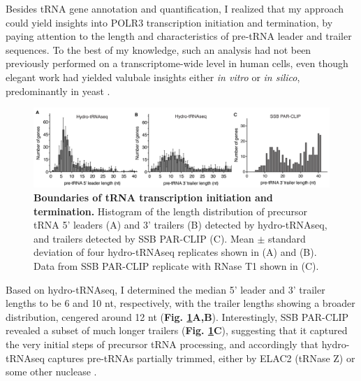 \documentclass[12pt]{rockefeller}
\begin{document}
Besides tRNA gene annotation and quantification, I realized that my approach could yield insights into POLR3 transcription initiation and termination, by paying attention to the length and characteristics of pre-tRNA leader and trailer sequences. To the best of my knowledge, such an analysis had not been previously performed on a transcriptome-wide level in human cells, even though elegant work had yielded valubale insights either \textit{in vitro} or \textit{in silico}, predominantly in yeast \cite{Maraia:2010kx,Arimbasseri:2013dg,Nielsen:2013be,Arimbasseri:2013by,Arimbasseri:2014hj,Arimbasseri:2015jg}.

\begin{figure}[!ht]%
\centering
\includegraphics[width=\textwidth]{paper6.png}%
\caption[Boundaries of tRNA transcription initiation and termination.]
{\textbf{Boundaries of tRNA transcription initiation and termination.}
Histogram of the length distribution of precursor tRNA 5’ leaders (A) and 3’ trailers (B) detected by hydro-tRNAseq, and trailers detected by SSB PAR-CLIP (C). Mean $\pm$ standard deviation of four hydro-tRNAseq replicates shown in (A) and (B). Data from SSB PAR-CLIP replicate with RNase T1 shown in (C).}
\centering
\label{paper6}%
\end{figure}

Based on hydro-tRNAseq, I determined the median 5’ leader and 3’ trailer lengths to be 6 and 10 nt, respectively, with the trailer lengths showing a broader distribution, cengered around 12 nt (\textbf{Fig. \ref{paper6}A,B}). Interestingly, SSB PAR-CLIP revealed a subset of much longer trailers (\textbf{Fig. \ref{paper6}C}), suggesting that it captured the very initial steps of precursor tRNA processing, and accordingly that hydro-tRNAseq captures pre-tRNAs partially trimmed, either by ELAC2 (tRNase Z) or some other nuclease \cite{Phizicky:2010jf}.
\end{document}
